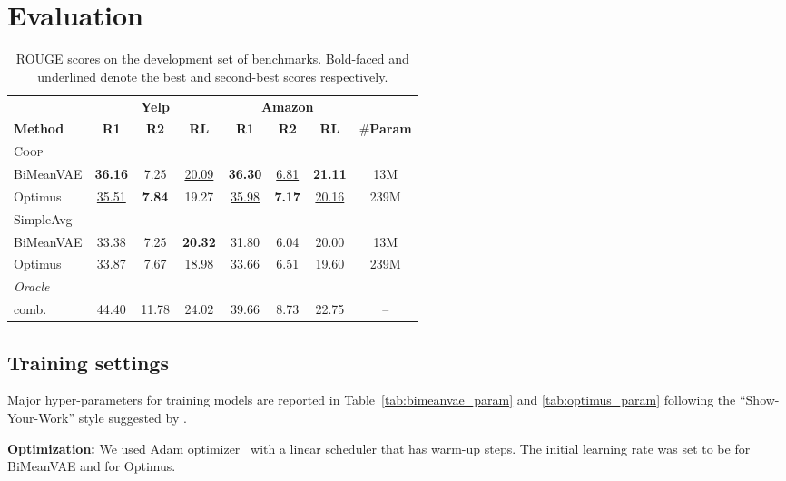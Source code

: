 \documentclass[11pt]{article}
\newcommand{\aggname}{\textsc{Coop}}
\newcommand{\name}{\mbox{\sc BiMeanVAE}}
\newcommand{\yelp}{\mbox{\bf Yelp}}
\newcommand{\amazon}{\mbox{\bf Amazon}}
\begin{document}
\section{Evaluation}

\begin{table*}[ht]
\centering
\begin{tabular}{lccccccc}\toprule
& \multicolumn{3}{c}{\yelp} & \multicolumn{3}{c}{\amazon} & \\
\textbf{Method} & \textbf{R1} & \textbf{R2} & \textbf{RL} & \textbf{R1} & \textbf{R2} & \textbf{RL} & \#\textbf{Param} \\\midrule
\aggname\\
\quad \name &\textbf{36.16} & 7.25 & \underline{20.09} & \textbf{36.30} & \underline{6.81} & \textbf{21.11} & 13M \\
\quad Optimus & \underline{35.51} & \textbf{7.84} & 19.27 & \underline{35.98} & \textbf{7.17} & \underline{20.16} & 239M \\\midrule
SimpleAvg\\
\quad \name & 33.38 & 7.25 & \textbf{20.32} & 31.80 & 6.04 & 20.00 & 13M \\
\quad Optimus & 33.87 & \underline{7.67} & 18.98 & 33.66 & 6.51 & 19.60 & 239M \\
\midrule
\textit{Oracle}\\
\quad comb. & 44.40 & 11.78 & 24.02 & 39.66 & 8.73 & 22.75 & -- \\
\bottomrule
\end{tabular}
\caption{ROUGE scores on the development set of benchmarks. Bold-faced and underlined denote the best and second-best scores respectively.
}\label{tab:dev_results}
\vspace{-0.2cm}
\end{table*}

\subsection{Training settings}
\label{app:exp_settings}
Major hyper-parameters for training models are reported in Table~\ref{tab:bimeanvae_param} and \ref{tab:optimus_param} following the ``Show-Your-Work'' style suggested by \citet{dodge-etal-2019-show}.

\noindent
{\bf Optimization:} We used Adam optimizer~\cite{kingma2015adam} with a linear scheduler that has warm-up steps. The initial learning rate was set to be  for \name{} and  for Optimus.
\end{document}
